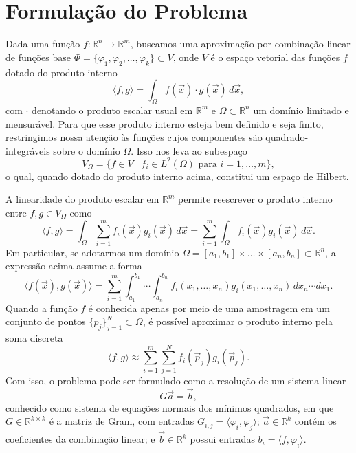 \section{Formulação do Problema}

Dada uma função $f:\mathbb{R}^n \to \mathbb{R}^m$, buscamos uma aproximação por
combinação linear de funções base
$\Phi = \{\varphi_1,\varphi_2,\ldots,\varphi_k\} \subset V$, onde $V$ é o
espaço vetorial das funções $f$ dotado do produto interno
\begin{equation*}
    \langle f,g \rangle =
    \int_{\Omega}f(\vec{x})\cdot g(\vec{x}) \, d\vec{x},
\end{equation*}
com $\cdot$ denotando o produto escalar usual em $\mathbb{R}^m$ e
$\Omega \subset\mathbb{R}^n$ um domínio limitado e mensurável.
%
Para que esse produto interno esteja bem definido e seja finito, restringimos
nossa atenção às funções cujos componentes são quadrado-integráveis sobre o
domínio $\Omega$. Isso nos leva ao subespaço
\begin{equation*}
    V_\Omega = \{f\in V \mid f_i \in L^2(\Omega) \text{~para~} i=1,\ldots,m\},
\end{equation*}
o qual, quando dotado do produto interno acima, constitui um espaço de
Hilbert\cite{franco_calculo_numerico_2006}.

%
A linearidade do produto escalar em $\mathbb{R}^m$ permite reescrever o produto
interno entre $f,g\in V_\Omega$ como
\begin{equation*}
    \langle f,g \rangle =
    \int_{\Omega} \sum_{i=1}^{m} f_i(\vec{x}) g_i(\vec{x}) \, d\vec{x} =
    \sum_{i=1}^{m} \int_{\Omega} f_i(\vec{x}) g_i(\vec{x}) \, d\vec{x}.
\end{equation*}
Em particular, se adotarmos um domínio
$\Omega = [a_1,b_1]\times\ldots\times[a_n,b_n]\subset\mathbb{R}^n$, a
expressão acima assume a forma
\begin{equation*}
    \langle f(\vec{x}), g(\vec{x}) \rangle =
    \sum_{i=1}^{m} \int_{a_1}^{b_1} \cdots \int_{a_n}^{b_n}
    f_i(x_1, \ldots, x_n)
    g_i(x_1, \ldots, x_n) \, dx_n \cdots dx_1.
\end{equation*}
Quando a função $f$ é conhecida apenas por meio de uma amostragem em um conjunto
de pontos $\{p_j\}_{j=1}^N\subset\Omega$, é possível aproximar o produto
interno pela soma discreta
\begin{equation*}
    \langle f,g \rangle \approx
    \sum_{i=1}^m\sum_{j=1}^{N} f_i(\vec{p}_j)g_i(\vec{p}_j).
\end{equation*}
Com isso, o problema pode ser formulado como a resolução de um sistema linear
\begin{equation*}
    G\vec{a} = \vec{b},
\end{equation*}
conhecido como sistema de equações normais dos mínimos
quadrados\cite{burden_faires_2011,franco_calculo_numerico_2006},
em que $G\in\mathbb{R}^{k \times k}$ é a matriz de Gram, com entradas
$G_{i,j} = \langle \varphi_i,\varphi_j\rangle$; $\vec{a}\in\mathbb{R}^k$
contém os coeficientes da combinação linear; e $\vec{b}\in\mathbb{R}^k$ possui
entradas $b_i = \langle f,\varphi_i\rangle$.
